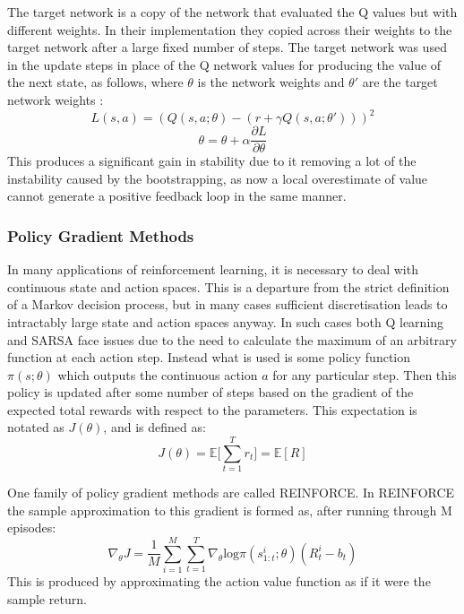 The target network is a copy of the network that evaluated the Q values  but with different weights. In their implementation they copied across their weights to the target network after a large fixed number of steps. The target network was used in the update steps in place of the Q network values for producing the value of the next state, as follows, where $\theta$ is the network weights and $\theta'$ are the target network weights :
\begin{equation*}
L(s,a) = (Q(s,a;\theta) - (r + \gamma Q(s,a; \theta' )))^2
\end{equation*}
\begin{equation}
\theta = \theta + \alpha \frac{\partial L}{\partial \theta}
\end{equation}
This produces a significant gain in stability due to it removing a lot of the instability caused by the bootstrapping, as now a local overestimate of value cannot generate a positive feedback loop in the same manner.

\subsubsection{Policy Gradient Methods}
In many applications of reinforcement learning, it is necessary to deal with continuous state and action spaces. This is a departure from the strict definition of a Markov decision process, but in many cases sufficient discretisation leads to intractably large state and action spaces anyway. In such cases both Q learning and SARSA face issues due to the need to calculate the maximum of an arbitrary function at each action step. Instead what is used is some policy function $\pi(s;\theta)$ which outputs the continuous action $a$ for any particular step. Then this policy is updated after some number of steps based on the gradient of the expected total rewards with respect to the parameters. This expectation is notated as $J(\theta)$, and is defined as:
\begin{equation}
J(\theta) = \mathbb{E}\big[\sum_{t=1}^T r_t \big] = \mathbb{E}[R]
\end{equation}

One family of policy gradient methods are called REINFORCE. In REINFORCE the sample approximation to this gradient is formed as, after running through M episodes:
\begin{equation}
\nabla_\theta J = \frac{1}{M}\sum_{i=1}^M\sum_{t=1}^T\nabla_\theta  \text{log}\pi ( s_{1:t}^i ; \theta)(R^i_t - b_t)
\label{eq:Reinforce}
\end{equation}
This is produced by approximating the action value function as if it were the sample return.

